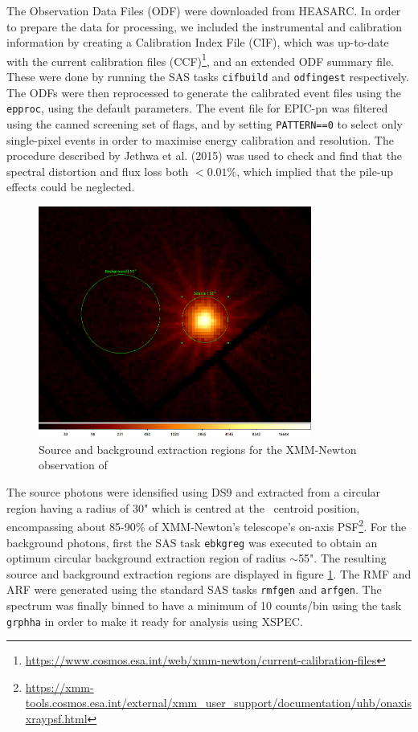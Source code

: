 	    	The Observation Data Files (ODF) were downloaded from HEASARC. In order to prepare the data for processing, we included the instrumental and calibration information by creating a Calibration Index File (CIF), which was up-to-date with the current calibration files (CCF)\footnote{\url{https://www.cosmos.esa.int/web/xmm-newton/current-calibration-files}}, and an extended ODF summary file. These were done by running the SAS tasks \texttt{cifbuild} and \texttt{odfingest} respectively. The ODFs were then reprocessed to generate the calibrated event files using the \texttt{epproc}, using the default parameters. The event file for EPIC-pn was filtered using the canned screening set of flags, and by setting \texttt{PATTERN==0} to select only single-pixel events in order to maximise energy calibration and resolution. The procedure described by Jethwa et al. (2015) \cite{jethwa2015pile} was used to check and find that the spectral distortion and flux loss both $<0.01\%$, which implied that the pile-up effects could be neglected.
	    	\begin{figure}[!htb]
		        \centering
		        \includegraphics[width=0.8\textwidth]{images/rx-j0925-7-4758_0111150101_src-bkg.png}
		        \caption{Source and background extraction regions for the XMM-Newton observation of \source}
		        \label{fig:src-bkg:pn}
		    \end{figure}
		    
		    The source photons were idensified using DS9 and extracted from a circular region having a radius of 30" which is centred at the \source\ centroid position, encompassing about 85-90\% of XMM-Newton's telescope's on-axis PSF\footnote{\url{https://xmm-tools.cosmos.esa.int/external/xmm_user_support/documentation/uhb/onaxisxraypsf.html}}. For the background photons, first the SAS task \texttt{ebkgreg} was executed to obtain an optimum circular background extraction region of radius $\sim$55". The resulting source and background extraction regions are displayed in figure \ref{fig:src-bkg:pn}. The RMF and ARF were generated using the standard SAS tasks \texttt{rmfgen} and \texttt{arfgen}. The spectrum was finally binned to have a minimum of 10 counts/bin using the task \texttt{grphha} in order to make it ready for analysis using XSPEC.

